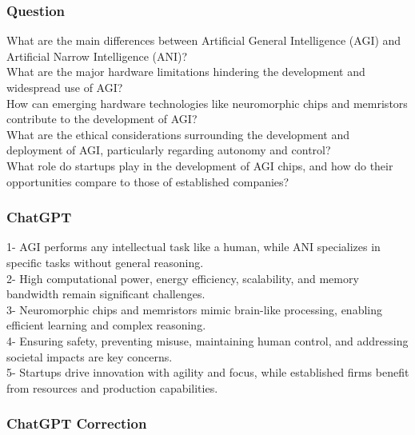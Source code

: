 \subsubsection{Question}
\begin{tcolorbox}[breakable]
What are the main differences between Artificial General Intelligence (AGI) and Artificial Narrow Intelligence (ANI)?\\
What are the major hardware limitations hindering the development and widespread use of AGI?\\
How can emerging hardware technologies like neuromorphic chips and memristors contribute to the development of AGI?\\
What are the ethical considerations surrounding the development and deployment of AGI, particularly regarding autonomy and control?\\
What role do startups play in the development of AGI chips, and how do their opportunities compare to those of established companies?

\end{tcolorbox}
\subsubsection{ChatGPT}
\begin{tcolorbox}[breakable]
    1- AGI performs any intellectual task like a human, while ANI specializes in specific tasks without general reasoning.\\
2- High computational power, energy efficiency, scalability, and memory bandwidth remain significant challenges.\\
3- Neuromorphic chips and memristors mimic brain-like processing, enabling efficient learning and complex reasoning.\\
4- Ensuring safety, preventing misuse, maintaining human control, and addressing societal impacts are key concerns.\\
5- Startups drive innovation with agility and focus, while established firms benefit from resources and production capabilities.

\end{tcolorbox}
\subsubsection{ChatGPT Correction}
\begin{tcolorbox}[breakable]
    
\end{tcolorbox}
